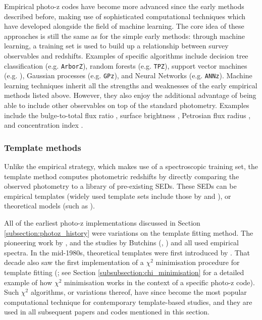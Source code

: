 Empirical photo-z codes have become more advanced since the early methods described before, making use of sophisticated computational techniques which have developed alongside the field of machine learning. The core idea of these approaches is still the same as for the simple early methods: through machine learning, a training set is used to build up a relationship  between survey observables and redshifts. Examples of specific algorithms include decision tree classification (e.g. \texttt{ArborZ}), random forests (e.g. \texttt{TPZ}), support vector machines (e.g. \citealt{2005PASP..117...79W}), Gaussian processes (e.g. \texttt{GPz}), and Neural Networks (e.g. \texttt{ANNz}).  Machine learning techniques inherit all the strengths and weaknesses of the early empirical methods listed above. However, they also enjoy the additional advantage of being able to include other observables on top of the standard photometry. Examples include the bulge-to-total flux ratio \citep{1999ApJS..121..417S}, surface brightness \citep{2007AJ....134.1360K}, Petrosian flux radius \citep{2004PASP..116..345C}, and concentration index \citep{2004PASP..116..345C}. \par


\subsubsection{Template methods}\label{subsubsection:template_methods}
Unlike the empirical strategy, which makes use of a spectroscopic training set, the template method computes photometric redshifts by directly comparing the observed photometry to a library of pre-existing SEDs. These SEDs can be empirical templates (widely used template sets include those by  \citealt{1980ApJS...43..393C} and \citealt{1996ApJ...467...38K}), or theoretical models (such as \citealt{2003MNRAS.344.1000B}).  \par

All of the earliest photo-z implementations discussed in Section \ref{subsection:photoz_history} were variations on the template fitting method. The pioneering work by \cite{1962IAUS...15..390B}, and the studies by Butchins (\citeyear{1981A&A....97..407B}, \citeyear{1983MNRAS.203.1239B}) and \cite{1986ApJ...303..154L} all used empirical spectra. In the mid-1980s, theoretical templates were first introduced by \cite{1985AJ.....90..418K}. That decade also saw the first implementation of a $\chi^2$ minimisation procedure for template fitting  (\citealt{1982ApJ...257L..57P}; see Section \ref{subsubsection:chi_minimisation} for a detailed example of how $\chi^2$ minimisation works in the context of a specific photo-z code). Such $\chi^2$ algorithms, or variations thereof, have since become the most popular computational technique for contemporary template-based studies, and they are used in all subsequent papers and codes mentioned in this section.  \par


